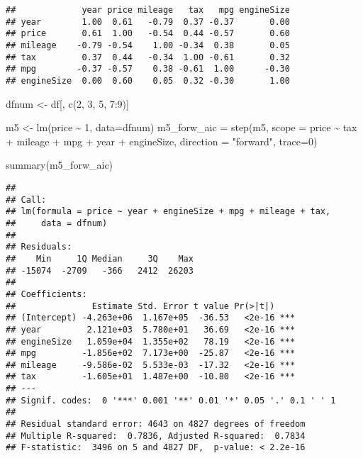 \documentclass[
]{article}
\newenvironment{Shaded}{\begin{snugshade}}{\end{snugshade}}
\newcommand{\AttributeTok}[1]{\textcolor[rgb]{0.77,0.63,0.00}{#1}}
\newcommand{\DecValTok}[1]{\textcolor[rgb]{0.00,0.00,0.81}{#1}}
\newcommand{\FunctionTok}[1]{\textcolor[rgb]{0.00,0.00,0.00}{#1}}
\newcommand{\NormalTok}[1]{#1}
\newcommand{\OtherTok}[1]{\textcolor[rgb]{0.56,0.35,0.01}{#1}}
\newcommand{\SpecialCharTok}[1]{\textcolor[rgb]{0.00,0.00,0.00}{#1}}
\newcommand{\StringTok}[1]{\textcolor[rgb]{0.31,0.60,0.02}{#1}}
\begin{document}
\begin{verbatim}
##             year price mileage   tax   mpg engineSize
## year        1.00  0.61   -0.79  0.37 -0.37       0.00
## price       0.61  1.00   -0.54  0.44 -0.57       0.60
## mileage    -0.79 -0.54    1.00 -0.34  0.38       0.05
## tax         0.37  0.44   -0.34  1.00 -0.61       0.32
## mpg        -0.37 -0.57    0.38 -0.61  1.00      -0.30
## engineSize  0.00  0.60    0.05  0.32 -0.30       1.00
\end{verbatim}

\begin{Shaded}
\begin{Highlighting}[]
\NormalTok{dfnum }\OtherTok{\textless{}{-}}\NormalTok{ df[, }\FunctionTok{c}\NormalTok{(}\DecValTok{2}\NormalTok{, }\DecValTok{3}\NormalTok{, }\DecValTok{5}\NormalTok{, }\DecValTok{7}\SpecialCharTok{:}\DecValTok{9}\NormalTok{)]}

\NormalTok{m5 }\OtherTok{\textless{}{-}} \FunctionTok{lm}\NormalTok{(price }\SpecialCharTok{\textasciitilde{}}  \DecValTok{1}\NormalTok{, }\AttributeTok{data=}\NormalTok{dfnum)}
\NormalTok{m5\_forw\_aic }\OtherTok{=} \FunctionTok{step}\NormalTok{(m5,}
\AttributeTok{scope =}\NormalTok{ price }\SpecialCharTok{\textasciitilde{}}\NormalTok{ tax }\SpecialCharTok{+}\NormalTok{ mileage }\SpecialCharTok{+}\NormalTok{ mpg }\SpecialCharTok{+}\NormalTok{ year }\SpecialCharTok{+}\NormalTok{ engineSize,}
\AttributeTok{direction =} \StringTok{"forward"}\NormalTok{, }\AttributeTok{trace=}\DecValTok{0}\NormalTok{)}

\FunctionTok{summary}\NormalTok{(m5\_forw\_aic)}
\end{Highlighting}
\end{Shaded}

\begin{verbatim}
## 
## Call:
## lm(formula = price ~ year + engineSize + mpg + mileage + tax, 
##     data = dfnum)
## 
## Residuals:
##    Min     1Q Median     3Q    Max 
## -15074  -2709   -366   2412  26203 
## 
## Coefficients:
##               Estimate Std. Error t value Pr(>|t|)    
## (Intercept) -4.263e+06  1.167e+05  -36.53   <2e-16 ***
## year         2.121e+03  5.780e+01   36.69   <2e-16 ***
## engineSize   1.059e+04  1.355e+02   78.19   <2e-16 ***
## mpg         -1.856e+02  7.173e+00  -25.87   <2e-16 ***
## mileage     -9.586e-02  5.533e-03  -17.32   <2e-16 ***
## tax         -1.605e+01  1.487e+00  -10.80   <2e-16 ***
## ---
## Signif. codes:  0 '***' 0.001 '**' 0.01 '*' 0.05 '.' 0.1 ' ' 1
## 
## Residual standard error: 4643 on 4827 degrees of freedom
## Multiple R-squared:  0.7836, Adjusted R-squared:  0.7834 
## F-statistic:  3496 on 5 and 4827 DF,  p-value: < 2.2e-16
\end{verbatim}
\end{document}
